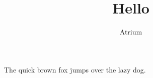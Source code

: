 \documentclass{article}
\title{Hello}
\author{Atrium}
\begin{document}
\maketitle

The quick brown fox jumps over the lazy dog.
\end{document}
